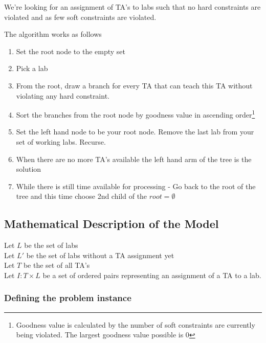 \documentclass{article}
\begin{document}
We're looking for an assignment of TA's to labs such that no hard
constraints are violated and as few soft constraints are violated.

The algorithm works as follows

\begin{enumerate}

\item Set the root node to the empty set

\item Pick a lab

\item From the root, draw a branch for every TA that can teach this TA
  without violating any hard constraint.
  

\item Sort the branches from the root node by goodness value in
  ascending order\footnote{Goodness value is calculated by the number
    of soft constraints are currently being violated. The largest
    goodness value possible is 0} 


\item Set the left hand node to be your root node. Remove the last lab
  from your set of working labs. Recurse.

\item When there are no more TA's available the left hand arm of the tree
  is the solution

\item While there is still time available for processing - Go back to
  the root of the tree and this time choose 2nd child of the $root = \emptyset$

\end{enumerate}

\subsection{Mathematical Description of the Model}

Let $L$ be the set of labs\\

Let $L'$ be the set of labs without a TA assignment yet\\

Let $T$ be the set of all TA's\\

Let $I : T \times L$ be a set of ordered pairs representing an
assignment of a TA to a lab.

\subsubsection{Defining the problem instance}
\end{document}
